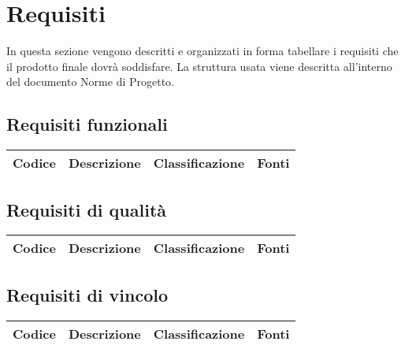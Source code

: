 \section{Requisiti}
In questa sezione vengono descritti e organizzati in forma tabellare i requisiti che il prodotto finale dovrà soddisfare. La struttura usata viene descritta all'interno del documento Norme di Progetto.

\subsection{Requisiti funzionali}
\begin{center}
	\begin{tabular}{ |c|c|c|c| }
		\hline
		\textbf{Codice} & \textbf{Descrizione} & \textbf{Classificazione} & \textbf{Fonti} \\
		\hline
	\end{tabular}
\end{center}

\subsection{Requisiti di qualità}
\begin{center}
	\begin{tabular}{ |c|c|c|c| } 
		\hline
		\textbf{Codice} & \textbf{Descrizione} & \textbf{Classificazione} & \textbf{Fonti} \\
		\hline
	\end{tabular}
\end{center}

\subsection{Requisiti di vincolo}
\begin{center}
	\begin{tabular}{ |c|c|c|c| } 
		\hline
		\textbf{Codice} & \textbf{Descrizione} & \textbf{Classificazione} & \textbf{Fonti} \\
		\hline
	\end{tabular}
\end{center}

